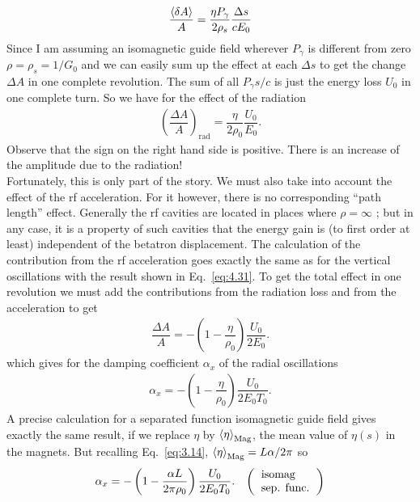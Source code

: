 \begin{align}
	\dfrac{\left< \delta A \right>}{A} = \dfrac{\eta P_\gamma}{2 \rho_s} \dfrac{\Delta s}{cE_0}
\end{align}
Since I am assuming an isomagnetic guide field wherever $P_\gamma$ is different from zero $\rho = \rho_s = 1/G_0$ and we can easily sum up the effect at each $\Delta s$ to get the change $\Delta A$ in one complete revolution. The sum of all $P_\gamma s/c$ is just the energy loss $U_0$ in one complete turn. So we have for the effect of the radiation
\begin{align}
	\left( \dfrac{\Delta A}{A} \right)_\text{rad} = \dfrac{\eta}{2\rho_0}\dfrac{U_0}{E_0}.
\end{align}
Observe that the sign on the right hand side is positive. There is an increase of the amplitude
 due to the radiation!\\
Fortunately, this is only part of the story. We must also take into account the effect of the rf acceleration. For it however, there is no corresponding ``path length'' effect. Generally the rf cavities are located in places where $\rho = \infty$ ; but in any case, it is a property of such cavities that the energy gain is (to first order at least) independent of the betatron displacement. The calculation of the contribution from the rf acceleration goes exactly the same as for the vertical oscillations with the result shown in Eq.~\eqref{eq:4.31}. To get the total effect in one revolution we must add the contributions from the radiation loss and from the acceleration to get
\begin{align}
	\dfrac{\Delta A}{A} = - \left(1 - \dfrac{\eta}{\rho_0} \right) \dfrac{U_0}{2 E_0}.
\end{align}
which gives for the damping coefficient $\alpha_x$ of the radial oscillations
\begin{align}\label{eq:4.48}
	\alpha_x = - \left(1 - \dfrac{\eta}{\rho_0} \right) \dfrac{U_0}{2 E_0 T_0}.
\end{align}
A precise calculation for a separated function isomagnetic guide field gives exactly the same result, if we replace $\eta$ by $\left< \eta \right>_\text{Mag}$, the mean value of $\eta(s)$ in the magnets. But recalling Eq.~\eqref{eq:3.14}, $\left< \eta \right>_\text{Mag} = L\alpha/2\pi$ so
\begin{align} \label{eq:4.49}
	\alpha_x = - \left(1 - \dfrac{\alpha L}{2\pi\rho_0} \right) \dfrac{U_0}{2 E_0 T_0}. && \left(\begin{tabular}{l}
\text{isomag} \\
\text{sep. func.}
\end{tabular}\right)
\end{align}
